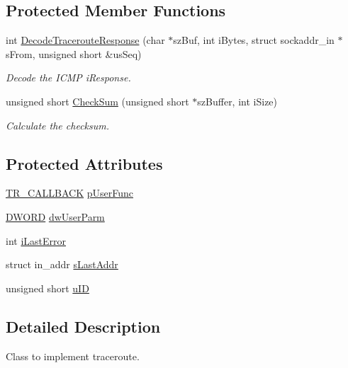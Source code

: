 \subsection*{\-Protected \-Member \-Functions}
\begin{DoxyCompactItemize}
\item 
int \hyperlink{class_c_trace_route_af0bdc4182b601a99a952b359ee13c798}{\-Decode\-Traceroute\-Response} (char $\ast$sz\-Buf, int i\-Bytes, struct sockaddr\-\_\-in $\ast$s\-From, unsigned short \&us\-Seq)
\begin{DoxyCompactList}\small\item\em \-Decode the \-I\-C\-M\-P i\-Response. \end{DoxyCompactList}\item 
unsigned short \hyperlink{class_c_trace_route_a4a5b31a4aedbfc403ee8b3ed6582f151}{\-Check\-Sum} (unsigned short $\ast$sz\-Buffer, int i\-Size)
\begin{DoxyCompactList}\small\item\em \-Calculate the checksum. \end{DoxyCompactList}\end{DoxyCompactItemize}
\subsection*{\-Protected \-Attributes}
\begin{DoxyCompactItemize}
\item 
\hyperlink{_c_trace_route_8h_af0130bce4928d8759ed87b2a5fd6e038}{\-T\-R\-\_\-\-C\-A\-L\-L\-B\-A\-C\-K} \hyperlink{class_c_trace_route_a7876c156fff35d015ad8c7e3d2160d7f}{p\-User\-Func}
\item 
\hyperlink{_x_plat_8h_aa39b39d94407451a6ec0226479db68cf}{\-D\-W\-O\-R\-D} \hyperlink{class_c_trace_route_a8cfc291a0ac1b247afe8acc03e490ffe}{dw\-User\-Parm}
\item 
int \hyperlink{class_c_trace_route_a8b59990ce5bc538b143da5284644fe75}{i\-Last\-Error}
\item 
struct in\-\_\-addr \hyperlink{class_c_trace_route_a364ba2e572488ba888b175b9e0025ae7}{s\-Last\-Addr}
\item 
unsigned short \hyperlink{class_c_trace_route_a23490973cbeb2c4cbf47376395efe93b}{u\-I\-D}
\end{DoxyCompactItemize}


\subsection{\-Detailed \-Description}
\-Class to implement traceroute. 

